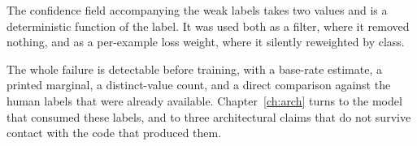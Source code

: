 The confidence field accompanying the weak labels takes two values and is a
deterministic function of the label. It was used both as a filter, where it
removed nothing, and as a per-example loss weight, where it silently reweighted
by class.

The whole failure is detectable before training, with a base-rate estimate, a
printed marginal, a distinct-value count, and a direct comparison against the
human labels that were already available. Chapter~\ref{ch:arch} turns to the
model that consumed these labels, and to three architectural claims that do not
survive contact with the code that produced them.

